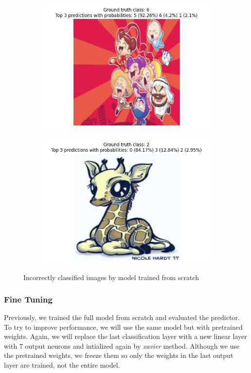 \documentclass[a4paper,11pt]{article}
\begin{document}
\begin{figure}[ht]
\begin{subfigure}[b]{0.45\textwidth}
        \includegraphics[width=\textwidth]{../out/single_shot_full_model/error_2.png}
    \end{subfigure}
    \hfill
    \begin{subfigure}[b]{0.45\textwidth}
        \includegraphics[width=\textwidth]{../out/single_shot_full_model/error_3.png}
    \end{subfigure}
    \caption{Incorrectly classified images by model trained from scratch}
    \label{fig:full_model_incorrect}
\end{figure}

\subsubsection{Fine Tuning}
Previously, we trained the full model from scratch and evaluated the predictor.
To try to improve performance, we will use the same model but with pretrained weights.
Again, we will replace the last classification layer with a new linear layer with $7$ output neurons and intialized again by \textit{xavier} method.
Although we use the pretrained weights, we freeze them so only the weights in the last output layer are trained, not the entire model.
\end{document}
